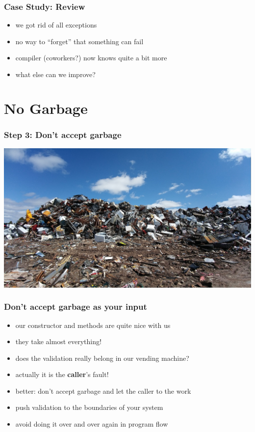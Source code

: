 \documentclass{beamer}
\begin{document}
\begin{frame}
  \frametitle{Case Study: Review}
  \begin{itemize}
  \item we got rid of all exceptions
  \item no way to ``forget'' that something can fail
  \item compiler (coworkers?) now knows quite a bit more
  \item what else can we improve?
  \end{itemize}
\end{frame}

\section{No Garbage}

\begin{frame}
  \frametitle{Step 3: Don't accept garbage}
  \includegraphics[width=\textwidth]{../pics/scrapyard-2441432_1280.jpg}
\end{frame}

\begin{frame}
  \frametitle{Don't accept garbage as your input}
  \begin{itemize}
    
  \item our constructor and methods are quite nice with us
  \item they take almost everything!
  \item does the validation really belong in our vending machine?
  \item actually it is the \textbf{caller}'s fault!
  \item better: don't accept garbage and let the caller to the work
  \item push validation to the boundaries of your system
  \item avoid doing it over and over again in program flow
  \end{itemize}
\end{frame}
\end{document}
